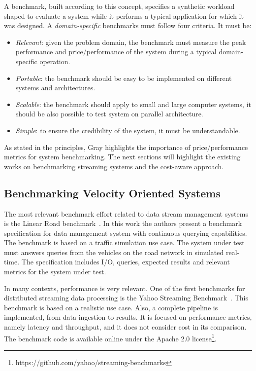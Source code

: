 A benchmark, built according to this concept, specifies a synthetic workload shaped to evaluate a system while it performs a typical application for which it was designed.
A \textit{domain-specific} benchmarks must follow four criteria. It must be: 
\begin{itemize}
\item \textit{Relevant}: given the problem domain, the benchmark must measure the peak performance and price/performance of the system during a typical domain-specific operation.
\item \textit{Portable}: the benchmark should be easy to be implemented on different systems and architectures.
\item \textit{Scalable}: the benchmark should apply to small and large computer systems, it should be also possible to test system on parallel architecture. 
\item \textit{Simple}: to ensure the credibility of the system, it must be understandable.
\end{itemize}

As stated in the principles, Gray \cite{gray1992benchmark} highlights the importance of price/performance metrics for system benchmarking.
The next sections will highlight the existing works on benchmarking streaming systems and the cost-aware approach.

\subsection{Benchmarking Velocity Oriented Systems}\label{sec:vel-bench}
The most relevant benchmark effort related to data stream management systems is the Linear Road benchmark~\cite{arasu2004linear}. In this work the authors present a benchmark specification for data management system with continuous querying capabilities. The benchmark is based on a traffic simulation use case. The system under test must answers queries from the vehicles on the road network in simulated real-time. The specification includes I/O, queries, expected results and relevant metrics for the system under test.

In many contexts, performance is very relevant. One of the first benchmarks for distributed streaming data processing is the Yahoo Streaming Benchmark~\cite{chintapalli2016benchmarking}.
This benchmark is based on a realistic use case. Also, a complete pipeline is implemented, from data ingestion to results. 
It is focused on performance metrics, namely latency and throughput, and it does not consider cost in its comparison. The benchmark code is available online under the Apache 2.0 license\footnote{https://github.com/yahoo/streaming-benchmarks}.


